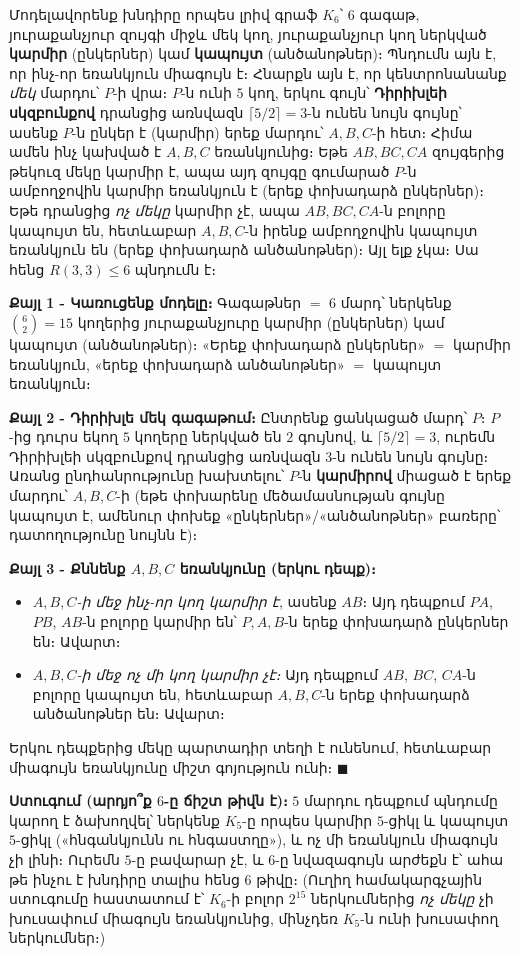 \documentclass[11pt,a4paper]{article}
\begin{document}
\begin{ideabox}
Մոդելավորենք խնդիրը որպես լրիվ գրաֆ $K_6$՝ $6$ գագաթ, յուրաքանչյուր զույգի միջև մեկ կող, յուրաքանչյուր
կող ներկված \textbf{կարմիր} (ընկերներ) կամ \textbf{կապույտ} (անծանոթներ)։ Պնդումն այն է, որ ինչ-որ
եռանկյուն միագույն է։ Հնարքն այն է, որ կենտրոնանանք \emph{մեկ} մարդու՝ $P$-ի վրա։ $P$-ն ունի $5$ կող, երկու գույն՝
\textbf{Դիրիխլեի սկզբունքով} դրանցից առնվազն $\lceil 5/2\rceil = 3$-ն ունեն նույն գույնը՝ ասենք $P$-ն
ընկեր է (կարմիր) երեք մարդու՝ $A,B,C$-ի հետ։ Հիմա ամեն ինչ կախված է $A,B,C$ եռանկյունից։
Եթե $AB,BC,CA$ զույգերից թեկուզ մեկը կարմիր է, ապա այդ զույգը գումարած $P$-ն ամբողջովին կարմիր
եռանկյուն է (երեք փոխադարձ ընկերներ)։ Եթե դրանցից \emph{ոչ մեկը} կարմիր չէ, ապա $AB,BC,CA$-ն բոլորը
կապույտ են, հետևաբար $A,B,C$-ն իրենք ամբողջովին կապույտ եռանկյուն են (երեք փոխադարձ անծանոթներ)։
Այլ ելք չկա։ Սա հենց $R(3,3)\le 6$ պնդումն է։
\end{ideabox}

\textbf{Քայլ 1 - Կառուցենք մոդելը։}
Գագաթներ $=$ $6$ մարդ՝ ներկենք $\binom{6}{2}=15$ կողերից յուրաքանչյուրը կարմիր (ընկերներ) կամ
կապույտ (անծանոթներ)։ «Երեք փոխադարձ ընկերներ» $=$ կարմիր եռանկյուն, «երեք
փոխադարձ անծանոթներ» $=$ կապույտ եռանկյուն։

\textbf{Քայլ 2 - Դիրիխլե մեկ գագաթում։}
Ընտրենք ցանկացած մարդ՝ $P$։ $P$-ից դուրս եկող $5$ կողերը ներկված են $2$ գույնով, և
$\lceil 5/2\rceil=3$, ուրեմն Դիրիխլեի սկզբունքով դրանցից առնվազն $3$-ն ունեն նույն գույնը։ Առանց
ընդհանրությունը խախտելու՝ $P$-ն \textbf{կարմիրով} միացած է երեք մարդու՝ $A,B,C$-ի (եթե փոխարենը
մեծամասնության գույնը կապույտ է, ամենուր փոխեք «ընկերներ»/«անծանոթներ» բառերը՝
դատողությունը նույնն է)։

\textbf{Քայլ 3 - Քննենք $A,B,C$ եռանկյունը (երկու դեպք)։}
\begin{itemize}[leftmargin=1.3em,topsep=2pt]
\item \emph{$A,B,C$-ի մեջ ինչ-որ կող կարմիր է}, ասենք $AB$։ Այդ դեպքում $P\!A$, $P\!B$, $AB$-ն բոլորը կարմիր են՝
$P,A,B$-ն երեք փոխադարձ ընկերներ են։ Ավարտ։
\item \emph{$A,B,C$-ի մեջ ոչ մի կող կարմիր չէ։} Այդ դեպքում $AB$, $BC$, $CA$-ն բոլորը կապույտ են, հետևաբար $A,B,C$-ն
երեք փոխադարձ անծանոթներ են։ Ավարտ։
\end{itemize}
Երկու դեպքերից մեկը պարտադիր տեղի է ունենում, հետևաբար միագույն եռանկյունը միշտ գոյություն ունի։ $\blacksquare$

\textbf{Ստուգում (արդյո՞ք $6$-ը ճիշտ թիվն է)։} $5$ մարդու դեպքում պնդումը կարող է ձախողվել՝ ներկենք
$K_5$-ը որպես կարմիր $5$-ցիկլ և կապույտ $5$-ցիկլ («հնգանկյունն ու հնգաստղը»), և ոչ մի եռանկյուն
միագույն չի լինի։ Ուրեմն $5$-ը բավարար չէ, և $6$-ը նվազագույն արժեքն է՝ ահա թե ինչու է խնդիրը տալիս
հենց $6$ թիվը։ (Ուղիղ համակարգչային ստուգումը հաստատում է՝ $K_6$-ի բոլոր $2^{15}$ ներկումներից
\emph{ոչ մեկը} չի խուսափում միագույն եռանկյունից, մինչդեռ $K_5$-ն ունի խուսափող ներկումներ։) \checkmark
\end{document}
